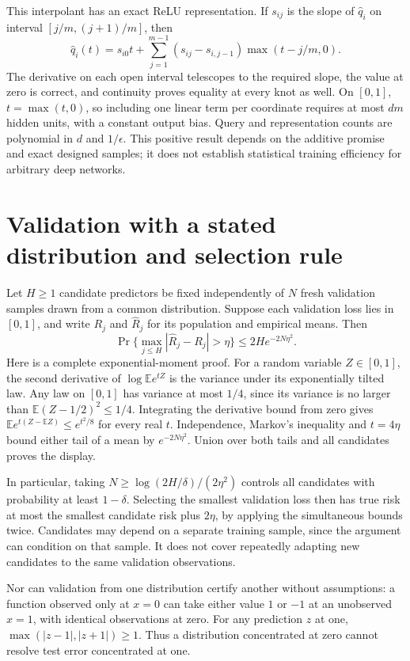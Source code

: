 \documentclass[11pt]{article}
\begin{document}
This interpolant has an exact ReLU representation. If $s_{ij}$
is the slope of $\widehat q_i$ on interval $[j/m,(j+1)/m]$,
then
\[
 \widehat q_i(t)=s_{i0}t+
 \sum_{j=1}^{m-1}(s_{ij}-s_{i,j-1})\max(t-j/m,0).
\]
The derivative on each open interval telescopes to the required
slope, the value at zero is correct, and continuity proves equality
at every knot as well. On $[0,1]$, $t=\max(t,0)$, so including
one linear term per coordinate requires at most $dm$ hidden
units, with a constant output bias. Query and representation
counts are polynomial in $d$ and $1/\epsilon$. This positive
result depends on the additive promise and exact designed
samples; it does not establish statistical training efficiency for
arbitrary deep networks.

\section{Validation with a stated distribution and selection rule}
Let $H\ge1$ candidate predictors be fixed independently of
$N$ fresh validation samples drawn from a common distribution.
Suppose each validation loss lies in $[0,1]$, and write $R_j$
and $\widehat R_j$ for its population and empirical means.
Then
\[
 \Pr\{\max_{j\le H}|\widehat R_j-R_j|>\eta\}
 \le 2H e^{-2N\eta^2}.
\]
Here is a complete exponential-moment proof. For a random variable
$Z\in[0,1]$, the second derivative of
$\log\mathbb E e^{tZ}$ is the variance under its exponentially
tilted law. Any law on $[0,1]$ has variance at most $1/4$,
since its variance is no larger than
$\mathbb E(Z-1/2)^2\le1/4$. Integrating the derivative bound
from zero gives
$\mathbb E e^{t(Z-\mathbb EZ)}\le e^{t^2/8}$ for every real $t$.
Independence, Markov's inequality and $t=4\eta$ bound either
tail of a mean by $e^{-2N\eta^2}$. Union over both tails and
all candidates proves the display.

In particular, taking
$N\ge\log(2H/\delta)/(2\eta^2)$ controls all candidates with
probability at least $1-\delta$. Selecting the smallest validation
loss then has true risk at most the smallest candidate risk plus
$2\eta$, by applying the simultaneous bounds twice. Candidates
may depend on a separate training sample, since the argument can
condition on that sample. It does not cover repeatedly adapting
new candidates to the same validation observations.

Nor can validation from one distribution certify another without
assumptions: a function observed only at $x=0$ can take either
value $1$ or $-1$ at an unobserved $x=1$, with identical
observations at zero. For any prediction $z$ at one,
$\max(|z-1|,|z+1|)\ge1$. Thus a distribution concentrated at
zero cannot resolve test error concentrated at one.
\end{document}

